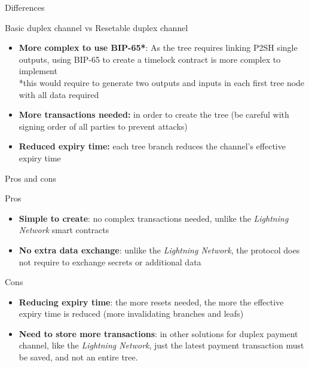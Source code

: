 \documentclass{beamer}
\begin{document}
\begin{frame}{Differences}
 \begin{block}{Basic duplex channel vs Resetable duplex channel}
  \begin{itemize}[<+->]
   \item \textbf{More complex to use BIP-65*}: As the tree requires linking P2SH single outputs, using BIP-65 to create a timelock contract is more complex to implement\\
         \pause
         \small{*this would require to generate two outputs and inputs in each first tree node with all data required}
         \pause
   \item \textbf{More transactions needed:} in order to create the tree (be careful with signing order of all parties to prevent attacks)
   \item \textbf{Reduced expiry time:} each tree branch reduces the channel's effective expiry time
  \end{itemize}
 \end{block}
\end{frame}
\begin{frame}{Pros and cons}
 \begin{exampleblock}{Pros}
  \begin{itemize}[<+->]
   \item \textbf{Simple to create}: no complex transactions needed, unlike the \textit{Lightning Network} smart contracts
   \item \textbf{No extra data exchange}: unlike the \textit{Lightning Network}, the protocol does not require to exchange secrets or additional data
  \end{itemize}
 \end{exampleblock}
 \pause
 \begin{alertblock}{Cons}
  \begin{itemize}[<+->]
   \item \textbf{Reducing expiry time}: the more resets needed, the more the effective expiry time is reduced (more invalidating branches and leafs)
   \item \textbf{Need to store more transactions}: in other solutions for duplex payment channel, like the \textit{Lightning Network}, just the latest payment transaction must be saved, and not an entire tree.
  \end{itemize}
 \end{alertblock}
\end{frame}
\end{document}

